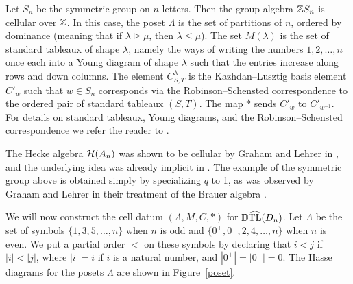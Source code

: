 \begin{example}
Let $S_{n}$ be the symmetric group on $n$ letters. Then the group algebra $\mathbb{Z} S_n$ is cellular over $\mathbb{Z}$. In this case, the poset $\Lambda$ is the set of partitions of $n$, ordered by dominance (meaning that if $\lambda\trianglerighteq\mu$, then $\lambda\leq\mu$). The set $M(\lambda)$ is the set of standard tableaux of shape $\lambda$, namely the ways of writing the numbers $1,2,\ldots,n$ once each into a Young diagram of shape $\lambda$ such that the entries increase along rows and down columns. The element $C^{\lambda}_{S,T}$ is the Kazhdan--Lusztig basis element $C'_w$ such that $w\in S_n$ corresponds via the Robinson--Schensted correspondence to the ordered pair of standard tableaux $(S,T)$. The map $*$ sends $C'_w$ to $C'_{w^{-1}}$. For details on standard tableaux, Young diagrams, and the Robinson--Schensted correspondence we refer the reader to \cite[Chapter 2]{Sagan2001}.
\end{example}

The Hecke algebra $\mathcal{H}(A_n)$ was shown to be cellular by Graham and Lehrer in \cite[Example 1.2]{Graham1996a}, and the underlying idea was already implicit in \cite{Kazhdan1979}. The example of the symmetric group above is obtained simply by specializing $q$ to 1, as was observed by Graham and Lehrer in their treatment of the Brauer algebra \cite{Graham1996a}. 

We will now construct the cell datum $(\Lambda, M, C, *)$ for $\operatorname{\mathbb{D}\widehat{TL}}(D_n)$. Let $\Lambda$ be the set of symbols $\{1,3,5,\ldots,n\}$ when $n$ is odd and $\{0^{+},0^{-},2,4,\ldots,n\}$ when $n$ is even. We put a partial order $<$ on these symbols by declaring that $i<j$ if $\left|i\right|<\left|j\right|$, where $\left|i\right|=i$ if $i$ is a natural number, and $\left|0^{+}\right|=\left|0^{-}\right|=0$. The Hasse diagrams for the posets $\Lambda$ are shown in Figure~\ref{poset}.


